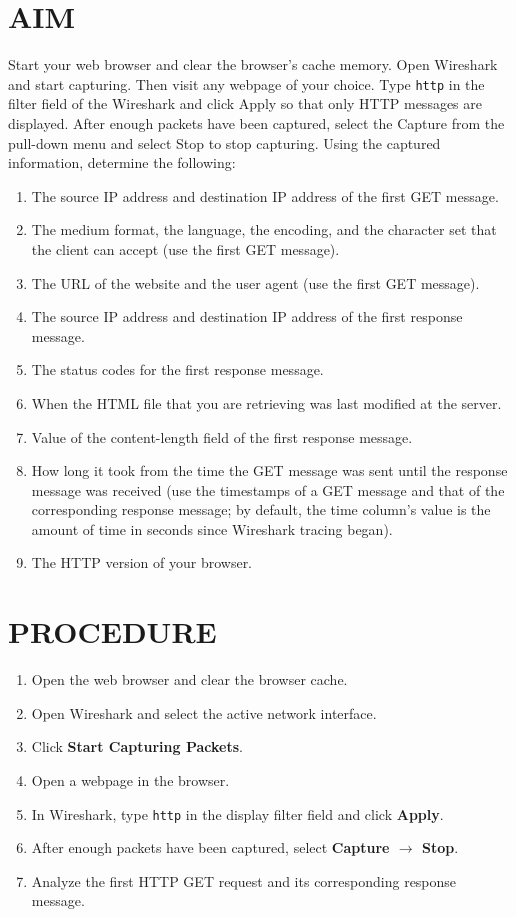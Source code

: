 \documentclass[12pt,a4paper]{article}
\begin{document}
	\section*{AIM}
	Start your web browser and clear the browser's cache memory. Open Wireshark and start capturing. Then visit any webpage of your choice. Type \texttt{http} in the filter field of the Wireshark and click Apply so that only HTTP messages are displayed. After enough packets have been captured, select the Capture from the pull-down menu and select Stop to stop capturing. Using the captured information, determine the following:
	\begin{enumerate}
		\item[(a)] The source IP address and destination IP address of the first GET message.
		\item[(b)] The medium format, the language, the encoding, and the character set that the client can accept (use the first GET message).
		\item[(c)] The URL of the website and the user agent (use the first GET message).
		\item[(d)] The source IP address and destination IP address of the first response message.
		\item[(e)] The status codes for the first response message.
		\item[(f)] When the HTML file that you are retrieving was last modified at the server.
		\item[(g)] Value of the content-length field of the first response message.
		\item[(h)] How long it took from the time the GET message was sent until the response message was received (use the timestamps of a GET message and that of the corresponding response message; by default, the time column's value is the amount of time in seconds since Wireshark tracing began).
		\item[(i)] The HTTP version of your browser.
	\end{enumerate}
	
	\section*{PROCEDURE}
	\begin{enumerate}
		\item Open the web browser and clear the browser cache.
		\item Open Wireshark and select the active network interface.
		\item Click \textbf{Start Capturing Packets}.
		\item Open a webpage in the browser.
		\item In Wireshark, type \texttt{http} in the display filter field and click \textbf{Apply}.
		\item After enough packets have been captured, select \textbf{Capture $\rightarrow$ Stop}.
		\item Analyze the first HTTP GET request and its corresponding response message.
	\end{enumerate}
	
\end{document}
